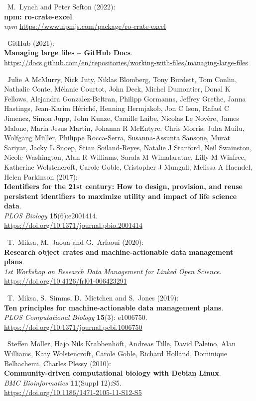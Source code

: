 \begin{thebibliography}{9}
~M.~Lynch and Peter Sefton (2022):\\
\textbf{npm: ro-crate-excel}.\\
\emph{npm} \url{https://www.npmjs.com/package/ro-crate-excel}

~GitHub (2021):\\
\textbf{Managing large files -- GitHub Docs}.\\
\url{https://docs.github.com/en/repositories/working-with-files/managing-large-files}

~Julie A McMurry, Nick Juty, Niklas Blomberg, Tony Burdett, Tom
Conlin, Nathalie Conte, Mélanie Courtot, John Deck, Michel Dumontier,
Donal K Fellows, Alejandra Gonzalez-Beltran, Philipp Gormanns, Jeffrey
Grethe, Janna Hastings, Jean-Karim Hériché, Henning Hermjakob, Jon C
Ison, Rafael C Jimenez, Simon Jupp, John Kunze, Camille Laibe, Nicolas
Le Novère, James Malone, Maria Jesus Martin, Johanna R McEntyre, Chris
Morris, Juha Muilu, Wolfgang Müller, Philippe Rocca-Serra,
Susanna-Assunta Sansone, Murat Sariyar, Jacky L Snoep, Stian
Soiland-Reyes, Natalie J Stanford, Neil Swainston, Nicole Washington,
Alan R Williams, Sarala M Wimalaratne, Lilly M Winfree, Katherine
Wolstencroft, Carole Goble, Cristopher J Mungall, Melissa A Haendel,
Helen Parkinson (2017):\\
\textbf{Identifiers for the 21st century: How to design, provision, and
reuse persistent identifiers to maximize utility and impact of life
science data}.\\
\emph{PLOS Biology} \textbf{15}(6):e2001414.\\
\url{https://doi.org/10.1371/journal.pbio.2001414}

~T.~Miksa, M.~Jaoua and G.~Arfaoui (2020):\\
\textbf{Research object crates and machine-actionable data management
plans}.\\
\emph{1st Workshop on Research Data Management for Linked Open
Science}.\\
\url{https://doi.org/10.4126/frl01-006423291}

~T.~Miksa, S.~Simms, D.~Mietchen and S.~Jones (2019):\\
\textbf{Ten principles for machine-actionable data management plans}.\\
\emph{PLOS Computational Biology} \textbf{15}(3): e1006750.\\
\url{https://doi.org/10.1371/journal.pcbi.1006750}

~Steffen Möller, Hajo Nils Krabbenhöft, Andreas Tille, David
Paleino, Alan Williams, Katy Wolstencroft, Carole Goble, Richard
Holland, Dominique Belhachemi, Charles Plessy (2010):\\
\textbf{Community-driven computational biology with Debian Linux}.\\
\emph{BMC Bioinformatics} \textbf{11}(Suppl 12):S5.\\
\url{https://doi.org/10.1186/1471-2105-11-S12-S5}


\end{thebibliography}
